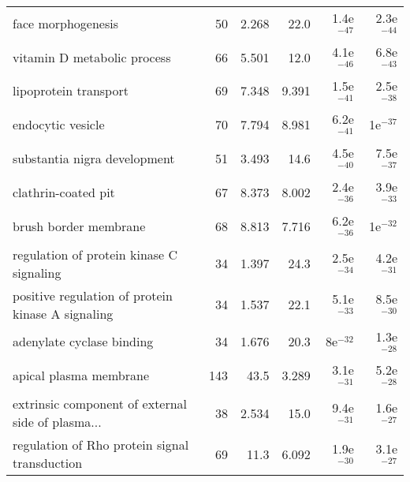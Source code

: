 \begin{longtable}{lrrrrr}
                                face morphogenesis &                      50 &                   2.268 &       22.0 &         1.4e$^{-47}$ &         2.3e$^{-44}$ \\
                       vitamin D metabolic process &                      66 &                   5.501 &       12.0 &         4.1e$^{-46}$ &         6.8e$^{-43}$ \\
                             lipoprotein transport &                      69 &                   7.348 &      9.391 &         1.5e$^{-41}$ &         2.5e$^{-38}$ \\
                                 endocytic vesicle &                      70 &                   7.794 &      8.981 &         6.2e$^{-41}$ &           1e$^{-37}$ \\
                      substantia nigra development &                      51 &                   3.493 &       14.6 &         4.5e$^{-40}$ &         7.5e$^{-37}$ \\
                               clathrin-coated pit &                      67 &                   8.373 &      8.002 &         2.4e$^{-36}$ &         3.9e$^{-33}$ \\
                             brush border membrane &                      68 &                   8.813 &      7.716 &         6.2e$^{-36}$ &           1e$^{-32}$ \\
          regulation of protein kinase C signaling &                      34 &                   1.397 &       24.3 &         2.5e$^{-34}$ &         4.2e$^{-31}$ \\
 positive regulation of protein kinase A signaling &                      34 &                   1.537 &       22.1 &         5.1e$^{-33}$ &         8.5e$^{-30}$ \\
                         adenylate cyclase binding &                      34 &                   1.676 &       20.3 &           8e$^{-32}$ &         1.3e$^{-28}$ \\
                            apical plasma membrane &                     143 &                    43.5 &      3.289 &         3.1e$^{-31}$ &         5.2e$^{-28}$ \\
 extrinsic component of external side of plasma... &                      38 &                   2.534 &       15.0 &         9.4e$^{-31}$ &         1.6e$^{-27}$ \\
     regulation of Rho protein signal transduction &                      69 &                    11.3 &      6.092 &         1.9e$^{-30}$ &         3.1e$^{-27}$ \\

\end{longtable}
